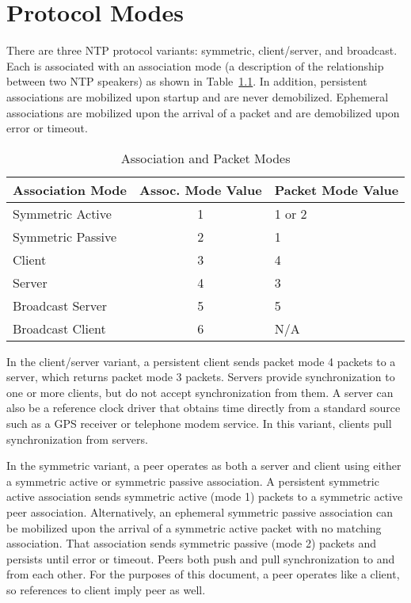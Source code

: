 \chapter{Protocol Modes}
\label{section-3}

There are three NTP protocol variants: symmetric, client/server, and
broadcast. Each is associated with an association mode (a
description of the relationship between two NTP speakers) as shown in
Table~\ref{association_and_packet_modes}. In addition, persistent associations are mobilized upon
startup and are never demobilized. Ephemeral associations are
mobilized upon the arrival of a packet and are demobilized upon error
or timeout.

\begin{table}[htb]
\center
\begin{tabular}{| l | c | l |}
\hline
Association Mode & Assoc. Mode Value & Packet Mode Value \\
\hline
\hline
Symmetric Active & 1 & 1 or 2 \\
Symmetric Passive & 2 & 1 \\
Client & 3 & 4 \\
Server & 4 & 3 \\
Broadcast Server & 5 & 5 \\
Broadcast Client & 6 & N/A \\
\hline
\end{tabular}
\caption{Association and Packet Modes}
\label{association_and_packet_modes}
\end{table}

In the client/server variant, a persistent client sends packet mode 4
packets to a server, which returns packet mode 3 packets. Servers
provide synchronization to one or more clients, but do not accept
synchronization from them. A server can also be a reference clock
driver that obtains time directly from a standard source such as a
GPS receiver or telephone modem service. In this variant, clients
pull synchronization from servers.

In the symmetric variant, a peer operates as both a server and client
using either a symmetric active or symmetric passive association. A
persistent symmetric active association sends symmetric active (mode
1) packets to a symmetric active peer association. Alternatively, an
ephemeral symmetric passive association can be mobilized upon the
arrival of a symmetric active packet with no matching association.
That association sends symmetric passive (mode 2) packets and
persists until error or timeout. Peers both push and pull
synchronization to and from each other. For the purposes of this
document, a peer operates like a client, so references to client
imply peer as well.

